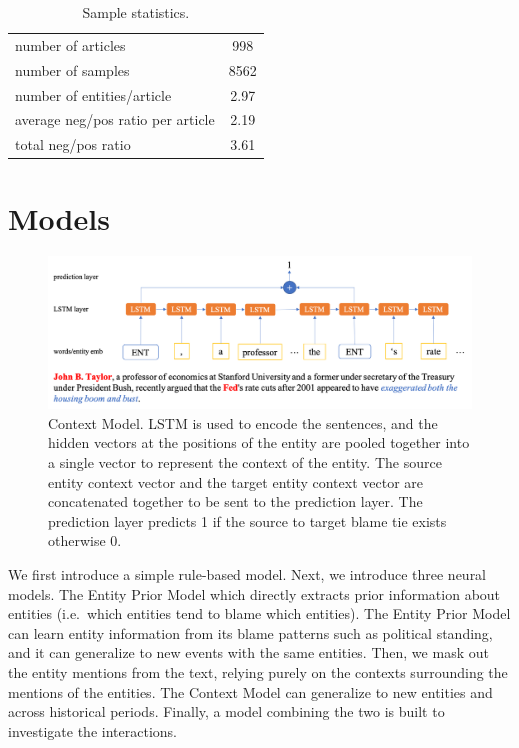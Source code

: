 \documentclass[letterpaper]{article} %
\begin{document}
\begin{table}[t]
\centering
\begin{tabular}{l c}
 \hline
 number of articles & 998 \\
 number of samples & 8562 \\
 number of entities/article & 2.97 \\
 average neg/pos ratio per article & 2.19 \\
 total neg/pos ratio & 3.61 \\
 \hline
\end{tabular}
\caption{Sample statistics.}
\label{table:samplestats}
\end{table}

\section{Models}

\begin{figure}[t!]
  \centering
  \includegraphics[width=\textwidth]{contextmodel}
  \caption{Context Model. LSTM is used to encode the sentences, and the hidden vectors at the positions of the entity are pooled together into a single vector to represent the context of the entity. The source entity context vector and the target entity context vector are concatenated together to be sent to the prediction layer. The prediction layer predicts 1 if the source to target blame tie exists otherwise 0.}
  \label{figure:contextmodel}
\end{figure}

We first introduce a simple rule-based model. Next, we introduce three neural models. The Entity Prior Model which directly extracts prior information about entities (i.e.\ which entities tend to blame which entities). The Entity Prior Model can learn entity information from its blame patterns such as political standing, and it can generalize to new events with the same entities. Then, we mask out the entity mentions from the text, relying purely on the contexts surrounding the mentions of the entities. The Context Model can generalize to new entities and across historical periods. Finally, a model combining the two is built to investigate the interactions.
\end{document}
